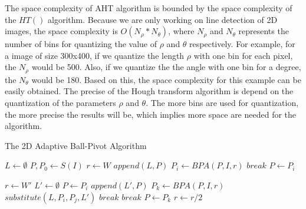 The space complexity of AHT algorithm is bounded by the space complexity of the $HT()$ algorithm. 
Because we are only working on line detection of 2D images, the space complexity is $O(N_\rho * N_\theta)$, 
where $N_\rho$ and $N_\theta$ represents the number of bins for quantizing the value of $\rho$
and $\theta$ respectively. For example, for a image of size 300x400, if we quantize the length $\rho$
with one bin for each pixel, the $N_\rho$ would be 500. Also, if we quantize the the angle with one
bin for a degree, the $N_\theta$ would be 180. Based on this, the space complexity for this example 
can be easily obtained. The precise of the Hough transform algorithm is depend on the quantization 
of the parameters $\rho$ and $\theta$. The more bins are used for quantization, the more precise the
results will be, which implies more space are needed for the algorithm.


\begin{algorithm}
\caption{The 2D Adaptive Ball-Pivot Algorithm}
\label{alg.ABPA}
\begin{algorithmic}[1]
\State $L \leftarrow \emptyset$
\State $P, P_0 \leftarrow S(I) $ 
\State $r \leftarrow W$ 
  
   \State $append(L, P)$ 
   \State $P_i \leftarrow BPA(P, I, r)$ 
      \State $break$ 
   \EndIf
   \State $P \leftarrow P_i$ 
\EndWhile

\State $r \leftarrow W'$ 
 
      \State $L' \leftarrow \emptyset$
      \State $P \leftarrow P_i$
         \State $append(L', P)$ 
         \State $P_k \leftarrow BPA(P, I, r)$ 
	  
	    \State $substitute(L, P_i, P_j, L')$ 
	    \State $break$
	   
	    \State $break$
	 \EndIf
	 \State $P \leftarrow P_k$ 
      \EndWhile
   \EndFor
   \State $r \leftarrow r/2$  
\EndWhile
\EndProcedure
\end{algorithmic}
\end{algorithm}

